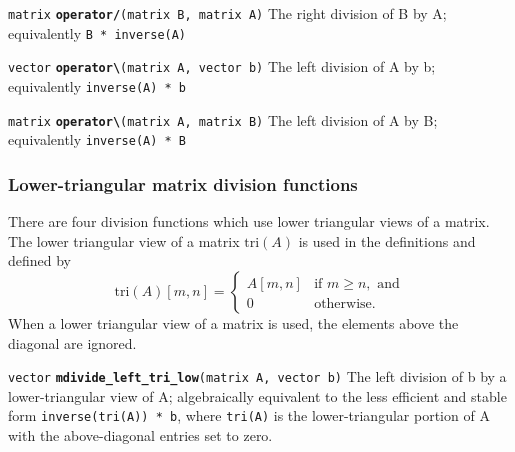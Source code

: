 \documentclass[
  10pt,
]{book}
\begin{document}
\texttt{matrix} \textbf{\texttt{operator/}}\texttt{(matrix\ B,\ matrix\ A)}\newline
The right division of B by A; equivalently \texttt{B\ *\ inverse(A)}


\texttt{vector} \textbf{\texttt{operator\textbackslash{}}}\texttt{(matrix\ A,\ vector\ b)}\newline
The left division of A by b; equivalently \texttt{inverse(A)\ *\ b}


\texttt{matrix} \textbf{\texttt{operator\textbackslash{}}}\texttt{(matrix\ A,\ matrix\ B)}\newline
The left division of A by B; equivalently \texttt{inverse(A)\ *\ B}

\hypertarget{lower-triangular-matrix-division-functions}{%
\subsubsection{Lower-triangular matrix division functions}\label{lower-triangular-matrix-division-functions}}

There are four division functions which use lower triangular views of
a matrix. The lower triangular view of a matrix \(\text{tri}(A)\) is
used in the definitions and defined by \[ \text{tri}(A)[m,n] = \left\{
\begin{array}{ll} A[m,n] & \text{if } m \geq n, \text{ and} \\[4pt] 0
& \text{otherwise}. \end{array} \right. \] When a lower triangular
view of a matrix is used, the elements above the diagonal are ignored.


\texttt{vector} \textbf{\texttt{mdivide\_left\_tri\_low}}\texttt{(matrix\ A,\ vector\ b)}\newline
The left division of b by a lower-triangular view of A; algebraically
equivalent to the less efficient and stable form \texttt{inverse(tri(A))\ *\ b}, where \texttt{tri(A)} is the lower-triangular portion of A with the
above-diagonal entries set to zero.

\end{document}
